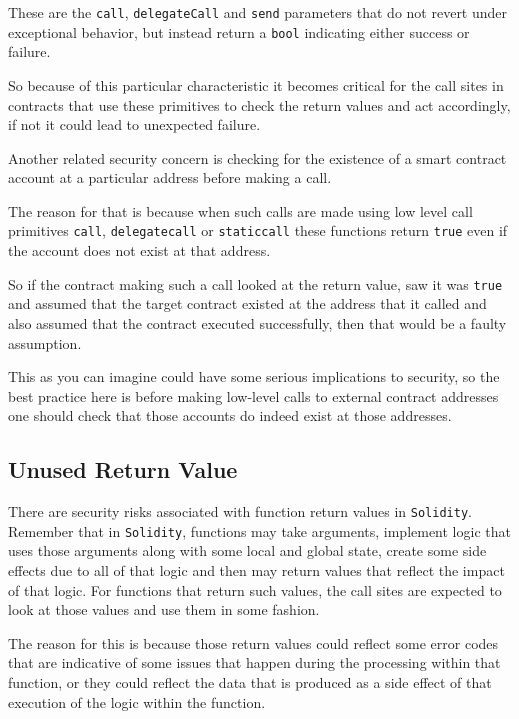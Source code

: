These are the \texttt{call}, \texttt{delegateCall} and \texttt{send}
parameters that do not revert under exceptional behavior, but instead
return a \texttt{bool} indicating either success or failure.

So because of this particular characteristic it becomes critical for the
call sites in contracts that use these primitives to check the return
values and act accordingly, if not it could lead to unexpected failure.

Another related security concern is checking for the existence of a
smart contract account at a particular address before making a call.

The reason for that is because when such calls are made using low level
call primitives \texttt{call}, \texttt{delegatecall} or
\texttt{staticcall} these functions return \texttt{true} even if the
account does not exist at that address.

So if the contract making such a call looked at the return value, saw it
was \texttt{true} and assumed that the target contract existed at the
address that it called and also assumed that the contract executed
successfully, then that would be a faulty assumption.

This as you can imagine could have some serious implications to
security, so the best practice here is before making low-level calls to
external contract addresses one should check that those accounts do
indeed exist at those addresses.

\subsection{Unused Return Value}\label{unused-return-value}

There are security risks associated with function return values in
\texttt{Solidity}. Remember that in \texttt{Solidity}, functions may
take arguments, implement logic that uses those arguments along with
some local and global state, create some side effects due to all of that
logic and then may return values that reflect the impact of that logic.
For functions that return such values, the call sites are expected to
look at those values and use them in some fashion.

The reason for this is because those return values could reflect some
error codes that are indicative of some issues that happen during the
processing within that function, or they could reflect the data that is
produced as a side effect of that execution of the logic within the
function.


